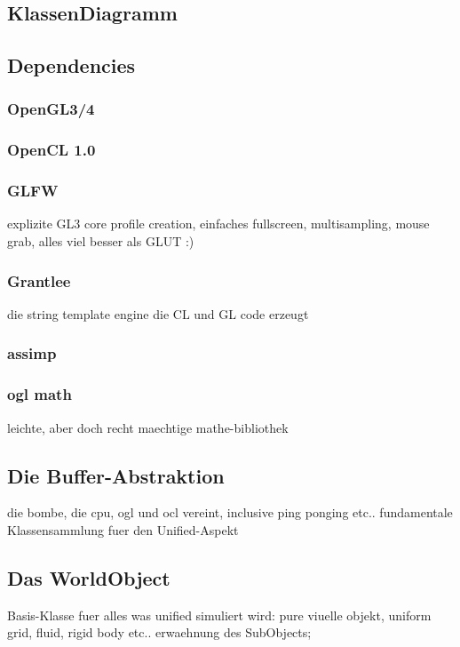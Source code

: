 
	
 

\subsection{KlassenDiagramm}

\subsection{Dependencies}

	
	\subsubsection{OpenGL3/4}
    \subsubsection{OpenCL 1.0}
    \subsubsection{GLFW}
    	explizite GL3 core profile creation, einfaches fullscreen, multisampling, mouse grab, alles viel besser als GLUT :)
    \subsubsection{Grantlee}
       die string template engine die CL und GL code erzeugt
    \subsubsection{assimp}
    \subsubsection{ogl math}
    	leichte, aber doch recht maechtige mathe-bibliothek
    	
    	
\subsection{Die Buffer-Abstraktion}   	
 	die bombe, die cpu, ogl und ocl vereint, inclusive ping ponging etc.. fundamentale Klassensammlung fuer den Unified-Aspekt
 
\subsection{Das WorldObject}
	Basis-Klasse fuer alles was unified simuliert wird: pure viuelle objekt, uniform grid, fluid, rigid body etc..
	erwaehnung des SubObjects;  
 
